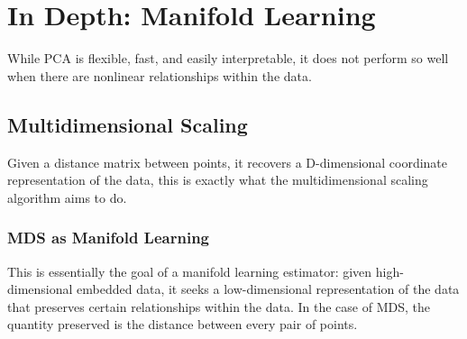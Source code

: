 \chapter{In Depth: Manifold Learning\label{Ch46}}
While PCA is flexible, fast, and easily interpretable, it does
not perform so well when there are nonlinear relationships within the data.

\section{Multidimensional Scaling}
Given a distance matrix between points, it recovers a D-dimensional coordinate representation
of the data, this is exactly what the multidimensional scaling algorithm aims to do.

\subsection{MDS as Manifold Learning}

This is essentially the goal of a manifold learning estimator: given high-dimensional
embedded data, it seeks a low-dimensional representation of the data that preserves
certain relationships within the data. In the case of MDS, the quantity preserved is the
distance between every pair of points.

